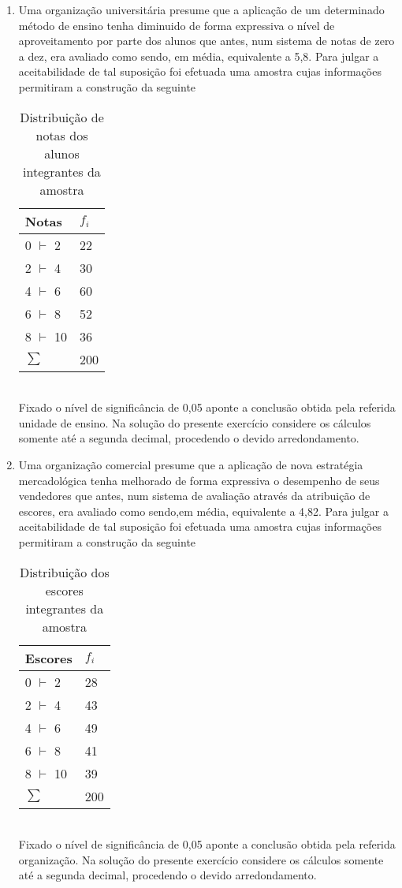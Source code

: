 \begin{enumerate}[resume]
\item Uma organização universitária presume que a aplicação de um determinado método de ensino tenha diminuido de forma expressiva o nível de aproveitamento por parte dos alunos que antes, num sistema de notas de zero a dez, era avaliado como sendo,
em média, equivalente a 5,8. Para julgar a aceitabilidade de tal suposição foi efetuada uma amostra cujas informações permitiram a construção da seguinte\\
	\begin{table}[!htb]
	\centering
	\caption{Distribuição de notas dos alunos integrantes da amostra}
	\begin{tabular}{ll}
	Notas & $f_{i}$ \\
	\hline 
	0 $\vdash$ 2 & 22  \\
	2 $\vdash$ 4 & 30 \\
	4 $\vdash$ 6 & 60  \\
	6 $\vdash$ 8 & 52 \\
	8 $\vdash$ 10 & 36  \\
	\hline 
	$\sum$ & 200
	\end{tabular}
	\end{table}\\
Fixado o nível de significância de 0,05 aponte a conclusão obtida pela referida unidade de ensino. Na solução do presente exercício considere os cálculos somente até a segunda decimal, procedendo o devido arredondamento.

\item	Uma organização comercial presume que a aplicação de nova estratégia mercadológica tenha melhorado de forma expressiva o desempenho de seus vendedores que antes, num sistema de avaliação através da atribuição de escores, era avaliado como sendo,em média, equivalente a 4,82. Para julgar a aceitabilidade de tal suposição foi efetuada uma amostra cujas informações permitiram a construção da seguinte\\
	\begin{table}[!htb]
	\centering
	\caption{Distribuição dos escores integrantes da amostra}
	\begin{tabular}{ll}
	Escores & $f_{i}$ \\
	\hline 
	0 $\vdash$ 2 & 28  \\
	2 $\vdash$ 4 & 43 \\
	4 $\vdash$ 6 & 49  \\
	6 $\vdash$ 8 & 41 \\
	8 $\vdash$ 10 & 39  \\
	\hline 
	$\sum$ & 200
	\end{tabular}
	\end{table}\\
Fixado o nível de significância de 0,05 aponte a conclusão obtida pela referida organização. Na solução do presente exercício considere os cálculos somente até a segunda decimal, procedendo o devido arredondamento.


\end{enumerate}
